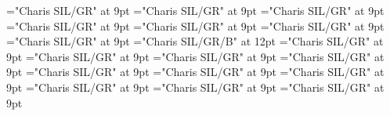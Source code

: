 \documentclass[gps1,twoside]{article}
\begin{document}
\font\spanspanheadwordvisiblecomplexformbackrefvisiblecomplexformbackrefssensesensessensesensessubentrysubentriesentrybefore="Charis SIL/GR" at 9pt
\font\spanspanowningentrysummarydefinitionvisiblecomplexformbackrefvisiblecomplexformbackrefssensesensessensesensessubentrysubentriesentrybefore="Charis SIL/GR" at 9pt
\font\spanowningentrysummarydefinitionvisiblecomplexformbackrefvisiblecomplexformbackrefssensesensessensesensessubentrysubentriesentryfirstchildbefore="Charis SIL/GR" at 9pt
\font\spanowningentrysummarydefinitionvisiblecomplexformbackrefvisiblecomplexformbackrefssensesensessensesensessubentrysubentriesentrylastchildafter="Charis SIL/GR" at 9pt
\font\nontrivialentryrootnontrivialentryrootnontrivialentryrootsvisiblecomplexformbackrefvisiblecomplexformbackrefssensesensessensesensessubentrysubentriesentrybefore="Charis SIL/GR" at 9pt
\font\nontrivialentryrootsvisiblecomplexformbackrefvisiblecomplexformbackrefssensesensessensesensessubentrysubentriesentrybefore="Charis SIL/GR" at 9pt
\font\nontrivialentryrootsvisiblecomplexformbackrefvisiblecomplexformbackrefssensesensessensesensessubentrysubentriesentryafter="Charis SIL/GR" at 9pt
\font\nontrivialentryrootnontrivialentryrootsvisiblecomplexformbackrefvisiblecomplexformbackrefssensesensessensesensessubentrysubentriesentry="Charis SIL/GR/B" at 12pt
\font\complexformsnotsubentrycomplexformsnotsubentrycomplexformsnotsubentriessubentrysubentriesentrybefore="Charis SIL/GR" at 9pt
\font\complexformsnotsubentriessubentrysubentriesentryafter="Charis SIL/GR" at 9pt
\font\complexformtypescomplexformsnotsubentrycomplexformsnotsubentriessubentrysubentriesentryafter="Charis SIL/GR" at 9pt
\font\spanspanreverseabbrcomplexformtypecomplexformtypescomplexformsnotsubentrycomplexformsnotsubentriessubentrysubentriesentrybefore="Charis SIL/GR" at 9pt
\font\spanspanheadwordcomplexformsnotsubentrycomplexformsnotsubentriessubentrysubentriesentrybefore="Charis SIL/GR" at 9pt
\font\spanspanowningentrysummarydefinitioncomplexformsnotsubentrycomplexformsnotsubentriessubentrysubentriesentrybefore="Charis SIL/GR" at 9pt
\font\spanowningentrysummarydefinitioncomplexformsnotsubentrycomplexformsnotsubentriessubentrysubentriesentryfirstchildbefore="Charis SIL/GR" at 9pt
\font\spanowningentrysummarydefinitioncomplexformsnotsubentrycomplexformsnotsubentriessubentrysubentriesentrylastchildafter="Charis SIL/GR" at 9pt
\font\nontrivialentryrootnontrivialentryrootnontrivialentryrootscomplexformsnotsubentrycomplexformsnotsubentriessubentrysubentriesentrybefore="Charis SIL/GR" at 9pt
\font\nontrivialentryrootscomplexformsnotsubentrycomplexformsnotsubentriessubentrysubentriesentrybefore="Charis SIL/GR" at 9pt
\end{document}
